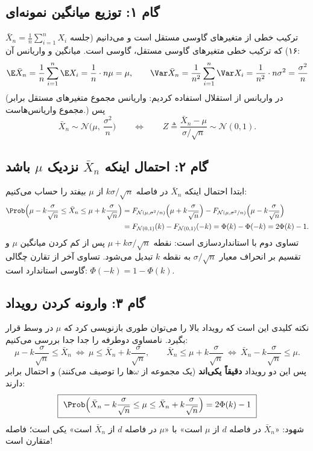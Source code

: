\subsection{گام ۱: توزیع میانگین نمونه‌ای}
$\bar X_n=\frac1n\sum_{i=1}^nX_i$ ترکیب خطی از متغیرهای گاوسی مستقل است و می‌دانیم (جلسه ۱۶) که ترکیب خطی متغیرهای گاوسی مستقل، گاوسی است. میانگین و واریانس آن:
\[
\E\bar X_n=\frac1n\sum_{i=1}^n\E X_i=\frac1n\cdot n\mu=\mu,\qquad
\Var\bar X_n=\frac1{n^2}\sum_{i=1}^n\Var X_i=\frac{1}{n^2}\cdot n\sigma^2=\frac{\sigma^2}{n}
\]
(در واریانس از استقلال استفاده کردیم: واریانس مجموع متغیرهای مستقل برابر مجموع واریانس‌هاست.) پس
\[
\bar X_n\sim\mathcal N\Big(\mu,\ \frac{\sigma^2}{n}\Big)
\qquad\Longleftrightarrow\qquad
Z\triangleq\frac{\bar X_n-\mu}{\sigma/\sqrt n}\sim\mathcal N(0,1).
\]

\subsection{گام ۲: احتمال اینکه $\bar X_n$ نزدیک $\mu$ باشد}
ابتدا احتمال اینکه $\bar X_n$ در فاصله $k\sigma/\sqrt n$ از $\mu$ بیفتد را حساب می‌کنیم:
\[
\begin{aligned}
\Prob\Big(\mu-k\frac{\sigma}{\sqrt n}\le\bar X_n\le\mu+k\frac{\sigma}{\sqrt n}\Big)
&=F_{\mathcal N(\mu,\sigma^2/n)}\Big(\mu+k\frac{\sigma}{\sqrt n}\Big)-F_{\mathcal N(\mu,\sigma^2/n)}\Big(\mu-k\frac{\sigma}{\sqrt n}\Big)\\
&=F_{\mathcal N(0,1)}(k)-F_{\mathcal N(0,1)}(-k)=\Phi(k)-\Phi(-k)=2\Phi(k)-1 .
\end{aligned}
\]
تساوی دوم با استانداردسازی است: نقطه $\mu+k\sigma/\sqrt n$ پس از کم کردن میانگین $\mu$ و تقسیم بر انحراف معیار $\sigma/\sqrt n$ به نقطه $k$ تبدیل می‌شود. تساوی آخر از تقارن چگالی گاوسی استاندارد است: $\Phi(-k)=1-\Phi(k)$.

\subsection{گام ۳: وارونه کردن رویداد}
نکته کلیدی این است که رویداد بالا را می‌توان طوری بازنویسی کرد که $\mu$ در وسط قرار بگیرد. نامساوی دوطرفه را جدا جدا بررسی می‌کنیم:
\[
\mu-k\frac{\sigma}{\sqrt n}\le\bar X_n\ \Longleftrightarrow\ \mu\le\bar X_n+k\frac{\sigma}{\sqrt n},
\qquad
\bar X_n\le\mu+k\frac{\sigma}{\sqrt n}\ \Longleftrightarrow\ \bar X_n-k\frac{\sigma}{\sqrt n}\le\mu .
\]
پس این دو رویداد \textbf{دقیقاً یکی‌اند} (یک مجموعه از $\omega$ها را توصیف می‌کنند) و احتمال برابر دارند:
\[
\boxed{\ \Prob\Big(\bar X_n-k\frac{\sigma}{\sqrt n}\le\mu\le\bar X_n+k\frac{\sigma}{\sqrt n}\Big)=2\Phi(k)-1\ }
\]
شهود: «$\bar X_n$ در فاصله $d$ از $\mu$ است» با «$\mu$ در فاصله $d$ از $\bar X_n$ است» یکی است؛ فاصله متقارن است!

